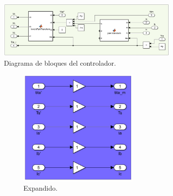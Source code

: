 \documentclass{article}
\begin{document}
\begin{enumerate}[label=\roman*.]
    \begin{figure}[H]
        \centering
        \includegraphics[width=0.8\textwidth]{controlador.png}
        \caption{Diagrama de bloques del controlador.}
    \end{figure}

    \begin{figure}[H]
        \begin{subfigure}[b]{0.7\textwidth}
            \centering
            \includegraphics[width=0.65\textwidth]{sensores_ideales.jpg}
            \caption{Expandido.}
        \end{subfigure}
        \begin{subfigure}[b]{0.3\textwidth}
            \centering

\end{subfigure}
\end{figure}
\end{enumerate}
\end{document}

